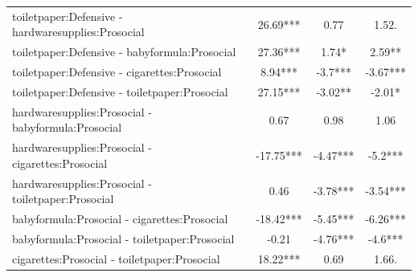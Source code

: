 \documentclass[]{report}
\begin{document}
\begin{longtable}{lccc}
			toiletpaper:Defensive - hardwaresupplies:Prosocial & 26.69*** & 0.77 & 1.52. \\ 
			toiletpaper:Defensive - babyformula:Prosocial & 27.36*** & 1.74* & 2.59** \\ 
			toiletpaper:Defensive - cigarettes:Prosocial & 8.94*** & -3.7*** & -3.67*** \\ 
			toiletpaper:Defensive - toiletpaper:Prosocial & 27.15*** & -3.02** & -2.01* \\ 
			hardwaresupplies:Prosocial - babyformula:Prosocial & 0.67 & 0.98 & 1.06 \\ 
			hardwaresupplies:Prosocial - cigarettes:Prosocial & -17.75*** & -4.47*** & -5.2*** \\ 
			hardwaresupplies:Prosocial - toiletpaper:Prosocial & 0.46 & -3.78*** & -3.54*** \\ 
			babyformula:Prosocial - cigarettes:Prosocial & -18.42*** & -5.45*** & -6.26*** \\ 
			babyformula:Prosocial - toiletpaper:Prosocial & -0.21 & -4.76*** & -4.6*** \\ 
			cigarettes:Prosocial - toiletpaper:Prosocial & 18.22*** & 0.69 & 1.66. \\ 
			\bottomrule
	
	\end{longtable}
	
\end{document}
